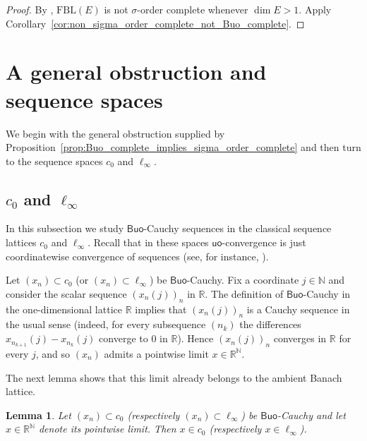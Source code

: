\documentclass[11pt]{amsart}
\newtheorem{lemma}[theorem]{Lemma}
\theoremstyle{definition}
\newcommand{\R}{\mathbb{R}}
\newcommand{\N}{\mathbb{N}}
\newcommand{\uo}{\ensuremath{\mathsf{uo}}}
\newcommand{\Buo}{\ensuremath{\mathsf{Buo}}}
\begin{document}
\begin{proof}
By \cite[Proposition~2.11(3)]{OikhbergTaylorTradaceteTroitsky2024},
$\mathrm{FBL}(E)$ is not $\sigma$-order complete whenever $\dim E>1$.
Apply Corollary~\ref{cor:non_sigma_order_complete_not_Buo_complete}.
\end{proof}

\section{A general obstruction and sequence spaces}\label{sec:general-obstruction}

We begin with the general obstruction supplied by
Proposition~\ref{prop:Buo_complete_implies_sigma_order_complete} and then turn
to the sequence spaces $c_0$ and $\ell_\infty$.


\subsection{$c_0$ and $\ell_\infty$}\label{sec:c0-linfty}

In this subsection we study \Buo-Cauchy sequences in the classical sequence
lattices $c_0$ and $\ell_\infty$.  Recall that in these spaces
$\uo$-convergence is just coordinatewise convergence of sequences (see, for
instance, \cite[{\S}3]{GaoXanthos2014}).

Let $(x_n)\subset c_0$ (or $(x_n)\subset\ell_\infty$) be \Buo-Cauchy.  Fix a
coordinate $j\in\N$ and consider the scalar sequence $(x_n(j))_n$ in $\R$.
The definition of \Buo-Cauchy in the one-dimensional lattice $\R$ implies
that $(x_n(j))_n$ is a Cauchy sequence in the usual sense (indeed, for
every subsequence $(n_k)$ the differences $x_{n_{k+1}}(j)-x_{n_k}(j)$
converge to $0$ in $\R$). Hence $(x_n(j))_n$ converges in $\R$ for every
$j$, and so $(x_n)$ admits a pointwise limit $x\in\R^\N$.

The next lemma shows that this limit already belongs to the ambient Banach
lattice.

\begin{lemma}\label{lem:pointwise_limit_in_c0}
Let $(x_n)\subset c_0$ (respectively $(x_n)\subset\ell_\infty$) be
\Buo-Cauchy and let $x\in\R^\N$ denote its pointwise limit. Then
$x\in c_0$ (respectively $x\in\ell_\infty$).
\end{lemma}
\end{document}
